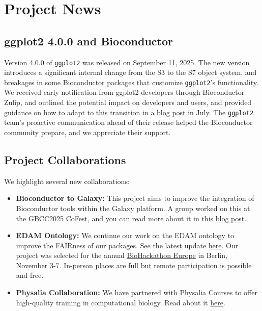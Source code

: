 \section{Project News}\label{project-news}

\subsection{ggplot2 4.0.0 and Bioconductor}\label{ggplot2-4.0.0-and-bioconductor}

Version 4.0.0 of \texttt{ggplot2} was released on September 11, 2025. The new version introduces a significant internal change from the S3 to the S7 object system, and breakages in some Bioconductor packages that customize \texttt{ggplot2}'s functionality. We received early notification from ggplot2 developers through Bioconductor Zulip, and outlined the potential impact on developers and users, and provided guidance on how to adapt to this transition in a \href{https://blog.bioconductor.org/posts/2025-07-07-ggplot2-update/}{blog post} in July. The \texttt{ggplot2} team's proactive communication ahead of their release helped the Bioconductor community prepare, and we appreciate their support.

\subsection{Project Collaborations}\label{project-collaborations}

We highlight several new collaborations:

\begin{itemize}
\tightlist
\item
  \textbf{Bioconductor to Galaxy:} This project aims to improve the integration of Bioconductor tools within the Galaxy platform. A group worked on this at the GBCC2025 CoFest, and you can read more about it in this \href{https://blog.bioconductor.org/posts/2025-07-03-bioc-to-galaxy/}{blog post}.
\item
  \textbf{EDAM Ontology:} We continue our work on the EDAM ontology to improve the FAIRness of our packages. See the latest update \href{https://blog.bioconductor.org/posts/2025-07-18-edam/}{here}. Our project was selected for the annual \href{https://github.com/elixir-europe/biohackathon-projects-2025/blob/main/13.md}{BioHackathon Europe} in Berlin, November 3-7. In-person places are full but remote participation is possible and free.
\item
  \textbf{Physalia Collaboration:} We have partnered with Physalia Courses to offer high-quality training in computational biology. Read about it \href{https://blog.bioconductor.org/posts/2025-06-20-physalia-collaboration/}{here}.
\end{itemize}

